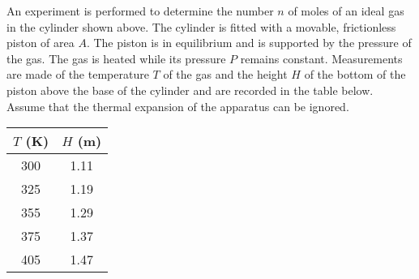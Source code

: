 \documentclass{../../../oss-ap12ibhl-print}
\begin{document}
\begin{questions}
  \newpage
  
  
  \question An experiment is performed to determine the number $n$ of moles of
  an ideal gas in the cylinder shown above. The cylinder is fitted with a
  movable, frictionless piston of area $A$. The piston is in equilibrium and is
  supported by the pressure of the gas. The gas is heated while its pressure
  $P$ remains constant. Measurements are made of the temperature $T$ of the gas
  and the height $H$ of the bottom of the piston above the base of the cylinder
  and are recorded in the table below. Assume that the thermal expansion of the
  apparatus can be ignored.
  \begin{center}
    \begin{tabular}{|c|c|}
      \hline
      $T$ (\si{\kelvin}) & $H$ (\si{\metre}) \\ \hline\hline
      300 & 1.11 \\
      325 & 1.19 \\
      355 & 1.29 \\
      375 & 1.37 \\
      405 & 1.47 \\
      \hline
    \end{tabular}
  \end{center}
\end{questions}
\end{document}
